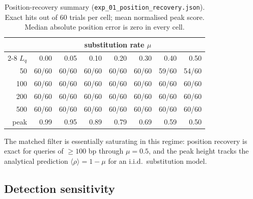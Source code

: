 \documentclass[twocolumn,11pt,a4paper]{article}
\theoremstyle{definition}
\theoremstyle{remark}
\begin{document}
\begin{table}[t]
  \centering\small
  \caption{Position-recovery summary (\texttt{exp\_01\_position\_recovery.json}).
  Exact hits out of $60$ trials per cell; mean normalised peak score.
  Median absolute position error is zero in every cell.}
  \label{tab:pos}
  \begin{tabular}{r | r r r r r r r}
    \toprule
    & \multicolumn{7}{c}{substitution rate $\mu$} \\
    \cmidrule(l){2-8}
    $L_q$ & 0.00 & 0.05 & 0.10 & 0.20 & 0.30 & 0.40 & 0.50 \\
    \midrule
    50  & 60/60 & 60/60 & 60/60 & 60/60 & 60/60 & 59/60 & 54/60 \\
    100 & 60/60 & 60/60 & 60/60 & 60/60 & 60/60 & 60/60 & 60/60 \\
    200 & 60/60 & 60/60 & 60/60 & 60/60 & 60/60 & 60/60 & 60/60 \\
    500 & 60/60 & 60/60 & 60/60 & 60/60 & 60/60 & 60/60 & 60/60 \\
    \midrule
    peak & 0.99 & 0.95 & 0.89 & 0.79 & 0.69 & 0.59 & 0.50 \\
    \bottomrule
  \end{tabular}
\end{table}

The matched filter is essentially saturating in this regime: position
recovery is exact for queries of $\geq 100$ bp through $\mu = 0.5$, and
the peak height tracks the analytical prediction $\langle \rho \rangle =
1 - \mu$ for an i.i.d.\ substitution model.

\subsection{Detection sensitivity}
\label{sec:exp:det}
\end{document}
